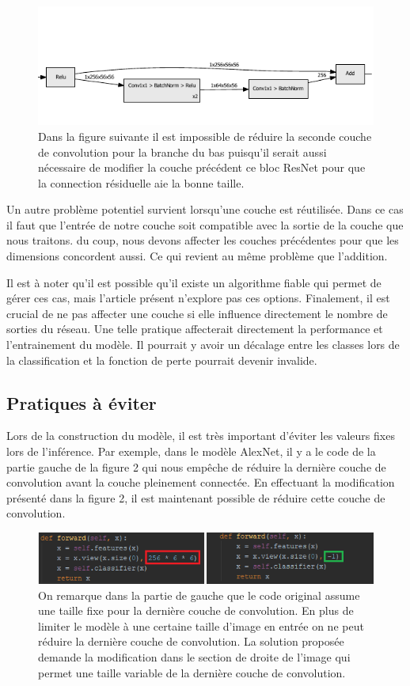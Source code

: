 \documentclass[12pt]{article}
\begin{document}
\begin{figure}[H]
	\centering
	\includegraphics{residual_add}
	\caption{Dans la figure suivante il est impossible de réduire la seconde couche de convolution pour la branche du bas puisqu'il serait aussi nécessaire de modifier la couche précédent ce bloc ResNet pour que la connection résiduelle aie la bonne taille.}
	\label{fig:residualadd}
\end{figure}

Un autre problème potentiel survient lorsqu'une couche est réutilisée. Dans ce cas il faut que l'entrée de notre couche soit compatible avec la sortie de la couche que nous traitons. du coup, nous devons affecter les couches précédentes pour que les dimensions concordent aussi. Ce qui revient au même problème que l'addition.

Il est à noter qu'il est possible qu'il existe un algorithme fiable qui permet de gérer ces cas, mais l'article présent n'explore pas ces options.
Finalement, il est crucial de ne pas affecter une couche si elle influence directement le nombre de sorties du réseau. Une telle pratique affecterait directement la performance et l'entrainement du modèle. Il pourrait y avoir un décalage entre les classes lors de la classification et la fonction de perte pourrait devenir invalide.

\subsection{Pratiques à éviter}
Lors de la construction du modèle, il est très important d’éviter les valeurs fixes lors de l’inférence. Par exemple, dans le modèle AlexNet, il y a le code de la partie gauche de la figure 2 qui nous empêche de réduire la dernière couche de convolution avant la couche pleinement connectée. En effectuant la modification présenté dans la figure 2, il est maintenant possible de réduire cette couche de convolution. 
\begin{figure}[H]
	\centering
	\includegraphics{mistake}
	\caption{On remarque dans la partie de gauche que le code original assume une taille fixe pour la dernière couche de convolution. En plus de limiter le modèle à une certaine taille d'image en entrée on ne peut réduire la dernière couche de convolution. La solution proposée demande la modification dans le section de droite de l'image qui permet une taille variable de la dernière couche de convolution.}
	\label{fig:mistake}
\end{figure}
\end{document}
